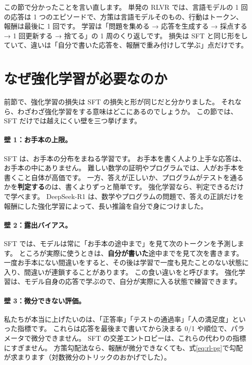 この節で分かったことを言い直します。
単発の RLVR では、言語モデルの 1 回の応答は 1 つのエピソードで、方策は言語モデルそのもの、行動はトークン、報酬は最後に 1 回です。
学習は「問題を集める → 応答を生成する → 採点する → 1 回更新する → 捨てる」の 1 周のくり返しです。
損失は SFT と同じ形をしていて、違いは「自分で書いた応答を、報酬で重み付けして学ぶ」点だけです。

\section{なぜ強化学習が必要なのか}\label{sec:rl-why}

前節で、強化学習の損失は SFT の損失と形が同じだと分かりました。
それなら、わざわざ強化学習をする意味はどこにあるのでしょうか。
この節では、SFT だけでは越えにくい壁を三つ挙げます。

\paragraph{壁 1：お手本の上限。}
SFT は、お手本の分布をまねる学習です。
お手本を書く人より上手な応答は、お手本の中にありません。
難しい数学の証明やプログラムでは、人がお手本を書くこと自体が高価です。
一方、答えが正しいか、プログラムがテストを通るかを\textbf{判定する}のは、書くよりずっと簡単です。
強化学習なら、判定できるだけで学べます。
DeepSeek-R1 は、数学やプログラムの問題で、答えの正誤だけを報酬にした強化学習によって、長い推論を自分で身につけました\cite{guo2025deepseekr1}。

\paragraph{壁 2：露出バイアス。}
SFT では、モデルは常に「お手本の途中まで」を見て次のトークンを予測します。
ところが実際に使うときは、\textbf{自分が書いた}途中までを見て次を書きます。
一度お手本にない間違いをすると、その後は学習で一度も見たことのない状態に入り、間違いが連鎖することがあります。
この食い違いをと呼びます\cite{ranzato2016sequence}。
強化学習は、モデル自身の応答で学ぶので、自分が実際に入る状態で練習できます。

\paragraph{壁 3：微分できない評価。}
私たちが本当に上げたいのは、「正答率」「テストの通過率」「人の満足度」といった指標です。
これらは応答を最後まで書いてから決まる 0/1 や順位で、パラメータで微分できません。
SFT の交差エントロピーは、これらの代わりの指標にすぎません。
方策勾配法なら、報酬が微分できなくても、式\eqref{eq:rl-pg}で勾配が求まります（対数微分のトリックのおかげでした）。

